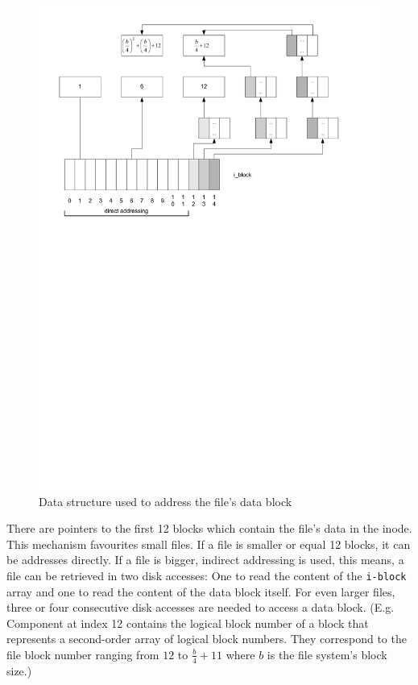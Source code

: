 \begin{figure}[H]
\begin{center}
\includegraphics[width=\linewidth]{./files/inc/pic/techRep_ext2_adressBlocks}
\caption{\label{fig:techRep_ext2_adressBlocks}Data structure used to address the file's data block}
\end{center}
\end{figure}

\noindent
There are pointers to the first 12 blocks which contain the file's data in the inode. This mechanism favourites small files. If a file is smaller or equal 12 blocks, it can be addresses directly. If a file is bigger, indirect addressing is used, this means, a file can be retrieved in two disk accesses: One to read the content of the \verb~i-block~ array and one to read the content of the data block itself. For even larger files, three or four consecutive disk accesses are needed to access a data block. (E.g. Component at index 12 contains the logical block number of a block that represents a second-order array of logical block numbers. They correspond to the file block number ranging from $12$ to $\frac{b}{4}+11$ where $b$ is the file system's block size.)

